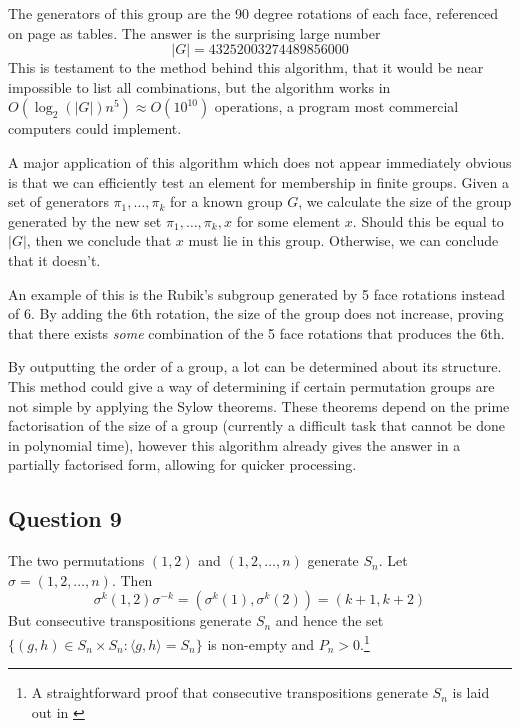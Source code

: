 \documentclass[10pt,a4paper,notitlepage]{article}
\newcommand{\abs}[1]{\lvert#1\rvert}
\begin{document}
The generators of this group are the 90 degree rotations of each face, referenced on page \pageref{perms} as tables. The answer is the surprising large number 
\begin{equation*}
\abs{G}=43252003274489856000
\end{equation*}
This is testament to the method behind this algorithm, that it would be near impossible to list all combinations, but the algorithm works in $O\left(\log_{2}\left(\abs{G}\right)n^{5}\right)\approx O(10^{10})$ operations, a program most commercial computers could implement.

A major application of this algorithm which does not appear immediately obvious is that we can efficiently test an element for membership in finite groups. Given a set of generators $\pi_{1},\hdots,\pi_{k}$ for a known group $G$, we calculate the size of the group generated by the new set $\pi_{1},\hdots,\pi_{k}, x$ for some element $x$.  Should this be equal to $\abs{G}$, then we conclude that $x$ must lie in this group. Otherwise, we can conclude that it doesn't. 

An example of this is the Rubik's subgroup generated by 5 face rotations instead of 6. By adding the 6th rotation, the size of the group does not increase, proving that there exists \textit{some} combination of the 5 face rotations that produces the 6th.

By outputting the order of a group, a lot can be determined about its structure. This method could give a way of determining if certain permutation groups are not simple by applying the Sylow theorems. These theorems depend on the prime factorisation of the size of a group (currently a difficult task that cannot be done in polynomial time), however this algorithm already gives the answer in a partially factorised form, allowing for quicker processing.

\subsection*{\centering Question 9}
The two permutations $(1,2)$ and $(1,2,\hdots,n)$ generate $S_{n}$. Let $\sigma=(1,2,\hdots,n)$. Then 
\begin{equation}
\sigma^{k}(1,2)\sigma^{-k}=(\sigma^{k}(1),\sigma^{k}(2))=(k+1,k+2)
\end{equation}
But consecutive transpositions generate $S_{n}$ and hence the set $\lbrace (g,h)\in S_{n}\times S_{n} : \langle g,h\rangle =S_{n}\rbrace$ is non-empty and $P_{n}>0$.\footnote{A straightforward proof that consecutive transpositions generate $S_{n}$ is laid out in \cite{PermStuff}}
\end{document}
